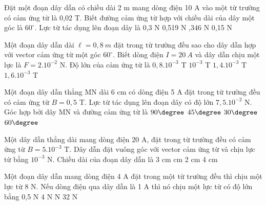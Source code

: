 \begin{vidu} %
Đặt một đoạn dây dẫn có chiều dài 2 m mang dòng điện 10 A vào một từ trường có cảm ứng từ là 0,02 T. Biết đường cảm ứng từ hợp với chiều dài của dây một góc là $60^\circ$. Lực từ tác dụng lên đoạn dây là
\choice
{0,3 N}
{0,519 N}
{,346 N}
{0,15 N}
\end{vidu}
\begin{vidu} %
Một đoạn dây dẫn dài $\ell = 0,8\ m$ đặt trong từ trường đều sao cho dây dẫn hợp với vector cảm ứng từ một góc ${60^\circ}$. Biết dòng điện $I = 20\ A$ và dây dẫn chịu một lực là $F = 2.10^{-2}$ N. Độ lớn của cảm ứng từ là
\choice
{$0,8.10^{-3}$ T}
{$10^{-3}$ T}
{\True $1,4.10^{-3}$ T}
{$1,6.10^{-3}$ T}
\end{vidu}
\begin{vidu} %
Một đoạn dây dẫn thẳng MN dài 6 cm có dòng điện 5 A đặt trong từ trường đều có cảm ứng từ $B = 0,5$ T. Lực từ tác dụng lên đoạn dây có độ lớn $7,5.10^{-2}$ N. Góc hợp bởi dây MN và đường cảm ứng từ là
\choice
{$90\degree$}
{$45\degree$}
{\True $30\degree$}
{$60\degree$}
\end{vidu}
\begin{vidu} %
Một dây dẫn thẳng dài mang dòng điện 20 A, đặt trong từ trường đều có cảm ứng từ $B = 5.10^{-3}$ T. Dây dẫn đặt vuông góc với vector cảm ứng từ và chịu lực từ bằng $10^{-3}$ N. Chiều dài của đoạn dây dẫn là
\choice
{3 cm}
{ cm}
{2 cm}
{4 cm}
\end{vidu}
\begin{vidu} %
Một đoạn dây dẫn mang dòng điện 4 A đặt trong một từ trường đều thì chịu một lực từ 8 N. Nếu dòng điện qua dây dẫn là 1 A thì nó chịu một lực từ có độ lớn bằng
\choice
{0,5 N}
{4 N}
{ N}
{32 N}
\end{vidu}
